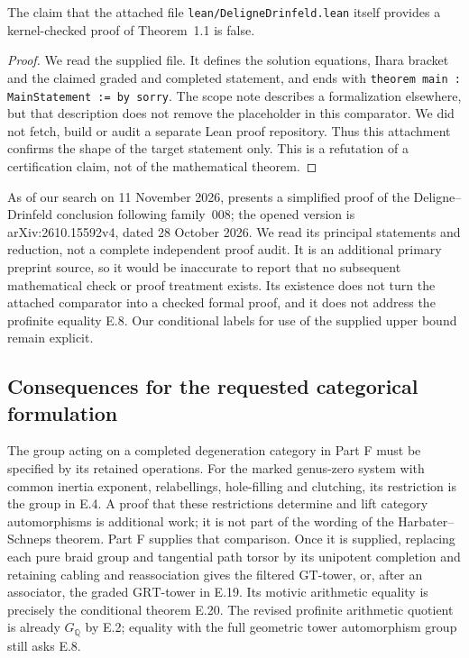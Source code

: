 The claim that the attached file
\texttt{lean/DeligneDrinfeld.lean} itself provides a kernel-checked
proof of Theorem~1.1 is false.
\begin{proof}
We read the supplied file.  It defines the solution equations, Ihara
bracket and the claimed graded and completed statement, and ends with
\texttt{theorem main : MainStatement := by sorry}.
The scope note describes a formalization elsewhere, but that description
does not remove the placeholder in this comparator.  We did not fetch,
build or audit a separate Lean proof repository.  Thus this attachment
confirms the shape of the target statement only.  This is a refutation
of a certification claim, not of the mathematical theorem.
\end{proof}

As of our search on 11 November 2026,
\citet[Theorem~1.1]{Willwacher2026After} presents a simplified proof
of the Deligne--Drinfeld conclusion following family~008; the opened
version is arXiv:2610.15592v4, dated 28 October 2026.
We read its principal statements and reduction, not a complete
independent proof audit.  It is an additional primary preprint source,
so it would be inaccurate to report that no subsequent mathematical
check or proof treatment exists.  Its existence does not turn the
attached comparator into a checked formal proof, and it does not
address the profinite equality E.8.  Our conditional labels for use of
the supplied upper bound remain explicit.

\subsection{Consequences for the requested categorical formulation}

The group acting on a completed degeneration category in Part F must
be specified by its retained operations.  For the marked genus-zero
system with common inertia exponent, relabellings, hole-filling and
clutching, its restriction is the group in E.4.  A proof that these
restrictions determine and lift category automorphisms is additional
work; it is not part of the wording of the Harbater--Schneps theorem.
Part F supplies that comparison.  Once it is supplied, replacing each
pure braid group and tangential path torsor by its unipotent completion
and retaining cabling and reassociation gives the filtered
$\mathrm{GT}$-tower, or, after an associator, the graded
$\mathrm{GRT}$-tower in E.19.  Its motivic arithmetic equality is
precisely the conditional theorem E.20.  The revised profinite
arithmetic quotient is already $G_{\mathbb Q}$ by E.2; equality with
the full geometric tower automorphism group still asks E.8.

